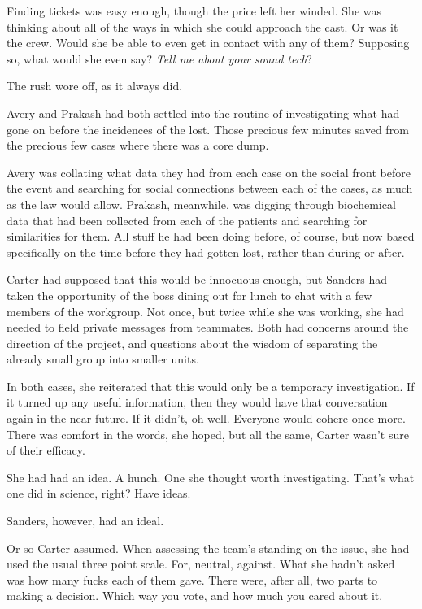Finding tickets was easy enough, though the price left her winded. She was thinking about all of the ways in which she could approach the cast. Or was it the crew. Would she be able to even get in contact with any of them? Supposing so, what would she even say? \emph{Tell me about your sound tech}?

The rush wore off, as it always did.

Avery and Prakash had both settled into the routine of investigating what had gone on before the incidences of the lost. Those precious few minutes saved from the precious few cases where there was a core dump.

Avery was collating what data they had from each case on the social front before the event and searching for social connections between each of the cases, as much as the law would allow. Prakash, meanwhile, was digging through biochemical data that had been collected from each of the patients and searching for similarities for them. All stuff he had been doing before, of course, but now based specifically on the time before they had gotten lost, rather than during or after.

Carter had supposed that this would be innocuous enough, but Sanders had taken the opportunity of the boss dining out for lunch to chat with a few members of the workgroup. Not once, but twice while she was working, she had needed to field private messages from teammates. Both had concerns around the direction of the project, and questions about the wisdom of separating the already small group into smaller units.

In both cases, she reiterated that this would only be a temporary investigation. If it turned up any useful information, then they would have that conversation again in the near future. If it didn't, oh well. Everyone would cohere once more. There was comfort in the words, she hoped, but all the same, Carter wasn't sure of their efficacy.

She had had an idea. A hunch. One she thought worth investigating. That's what one did in science, right? Have ideas.

Sanders, however, had an ideal.

Or so Carter assumed. When assessing the team's standing on the issue, she had used the usual three point scale. For, neutral, against. What she hadn't asked was how many fucks each of them gave. There were, after all, two parts to making a decision. Which way you vote, and how much you cared about it.

